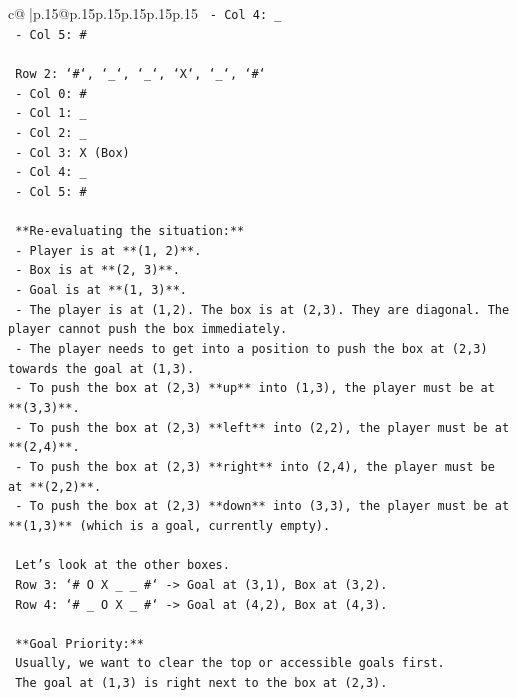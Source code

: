 \documentclass{article}
\begin{document}
{\begin{supertabular}{c@{$\;$}|p{.15\linewidth}@{}p{.15\linewidth}p{.15\linewidth}p{.15\linewidth}p{.15\linewidth}p{.15\linewidth}}
{{{\texttt{   {-} Col 4: \_} \\
\texttt{   {-} Col 5: \#} \\
\\ 
\texttt{   Row 2: `\#`, `\_`, `\_`, `X`, `\_`, `\#`} \\
\texttt{   {-} Col 0: \#} \\
\texttt{   {-} Col 1: \_} \\
\texttt{   {-} Col 2: \_} \\
\texttt{   {-} Col 3: X (Box)} \\
\texttt{   {-} Col 4: \_} \\
\texttt{   {-} Col 5: \#} \\
\\ 
\texttt{   **Re{-}evaluating the situation:**} \\
\texttt{   {-} Player is at **(1, 2)**.} \\
\texttt{   {-} Box is at **(2, 3)**.} \\
\texttt{   {-} Goal is at **(1, 3)**.} \\
\texttt{   {-} The player is at (1,2). The box is at (2,3). They are diagonal. The player cannot push the box immediately.} \\
\texttt{   {-} The player needs to get into a position to push the box at (2,3) towards the goal at (1,3).} \\
\texttt{   {-} To push the box at (2,3) **up** into (1,3), the player must be at **(3,3)**.} \\
\texttt{   {-} To push the box at (2,3) **left** into (2,2), the player must be at **(2,4)**.} \\
\texttt{   {-} To push the box at (2,3) **right** into (2,4), the player must be at **(2,2)**.} \\
\texttt{   {-} To push the box at (2,3) **down** into (3,3), the player must be at **(1,3)** (which is a goal, currently empty).} \\
\\ 
\texttt{   Let's look at the other boxes.} \\
\texttt{   Row 3: `\# O X \_ \_ \#` {-}> Goal at (3,1), Box at (3,2).} \\
\texttt{   Row 4: `\# \_ O X \_ \#` {-}> Goal at (4,2), Box at (4,3).} \\
\\ 
\texttt{   **Goal Priority:**} \\
\texttt{   Usually, we want to clear the top or accessible goals first.} \\
\texttt{   The goal at (1,3) is right next to the box at (2,3).} \\
}}}
\end{supertabular}}
\end{document}
